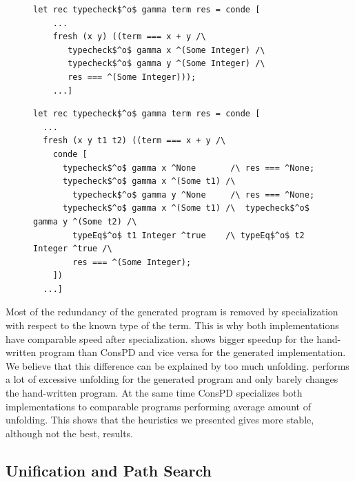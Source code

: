 \begin{figure}[!t]
  \centering
  \begin{minipage}{0.95\textwidth}
    \begin{lstlisting}[label={type:hand}, caption={A fragment of hand-written typechecker}, captionpos=b, frame=tb]
  let rec typecheck$^o$ gamma term res = conde [
    ...
    fresh (x y) ((term === x + y /\
       typecheck$^o$ gamma x ^(Some Integer) /\
       typecheck$^o$ gamma y ^(Some Integer) /\
       res === ^(Some Integer)));
    ...]
    \end{lstlisting}
  \end{minipage}

  \begin{minipage}{0.95\textwidth}
    \begin{lstlisting}[label={type:gen}, caption={A fragment of generated typechecker}, captionpos=b, frame=tb]
let rec typecheck$^o$ gamma term res = conde [
  ...
  fresh (x y t1 t2) ((term === x + y /\
    conde [
      typecheck$^o$ gamma x ^None       /\ res === ^None;
      typecheck$^o$ gamma x ^(Some t1) /\
        typecheck$^o$ gamma y ^None     /\ res === ^None;
      typecheck$^o$ gamma x ^(Some t1) /\  typecheck$^o$ gamma y ^(Some t2) /\
        typeEq$^o$ t1 Integer ^true    /\ typeEq$^o$ t2 Integer ^true /\
        res === ^(Some Integer);
    ])
  ...]
    \end{lstlisting}
  \end{minipage}
\end{figure}

Most of the redundancy of the generated program is removed by specialization with respect to the known type of the term.
This is why both implementations have comparable speed after specialization.
\ecce shows bigger speedup for the hand-written program than ConsPD and vice versa for the generated implementation.
We believe that this difference can be explained by too much unfolding.
\ecce performs a lot of excessive unfolding for the generated program and only barely changes the hand-written program.
At the same time ConsPD specializes both implementations to comparable programs performing average amount of unfolding.
This shows that the heuristics we presented gives more stable, although not the best, results.

\subsection{Unification and Path Search}

